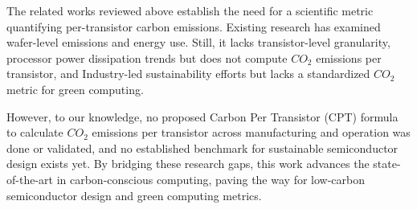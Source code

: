 The related works reviewed above establish the need for a scientific metric quantifying per-transistor carbon emissions. Existing research has examined wafer-level emissions and energy use. Still, it lacks transistor-level granularity, processor power dissipation trends but does not compute $CO_2$ emissions per transistor, and Industry-led sustainability efforts but lacks a standardized $CO_2$ metric for green computing.

However, to our knowledge, no proposed Carbon Per Transistor (CPT) formula to calculate $CO_2$ emissions per transistor across manufacturing and operation was done or validated, and no established benchmark for sustainable semiconductor design exists yet. By bridging these research gaps, this work advances the state-of-the-art in carbon-conscious computing, paving the way for low-carbon semiconductor design and green computing metrics.